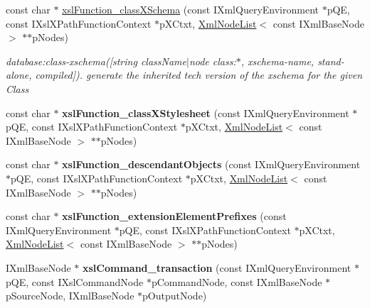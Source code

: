 \begin{DoxyCompactItemize}
\item 
const char $\ast$ \hyperlink{group__XSLModule-Functions_gaecb15d87b4313f702c17cd0e209b7104}{xsl\-Function\-\_\-class\-X\-Schema} (const \-I\-Xml\-Query\-Environment $\ast$p\-Q\-E, const \-I\-Xsl\-X\-Path\-Function\-Context $\ast$p\-X\-Ctxt, \hyperlink{classgeneral__server_1_1XmlNodeList}{\-Xml\-Node\-List}$<$ const \-I\-Xml\-Base\-Node $>$ $\ast$$\ast$p\-Nodes)
\begin{DoxyCompactList}\small\item\em database\-:class-\/xschema(\mbox{[}string class\-Name$|$node class\-:$\ast$, xschema-\/name, stand-\/alone, compiled\mbox{]}). generate the inherited tech version of the xschema for the given \-Class \end{DoxyCompactList}\item 
\hypertarget{group__XSLModule-Functions_ga083e49023fd1786191327ea21e8a41cf}{const char $\ast$ {\bfseries xsl\-Function\-\_\-class\-X\-Stylesheet} (const \-I\-Xml\-Query\-Environment $\ast$p\-Q\-E, const \-I\-Xsl\-X\-Path\-Function\-Context $\ast$p\-X\-Ctxt, \hyperlink{classgeneral__server_1_1XmlNodeList}{\-Xml\-Node\-List}$<$ const \-I\-Xml\-Base\-Node $>$ $\ast$$\ast$p\-Nodes)}\label{group__XSLModule-Functions_ga083e49023fd1786191327ea21e8a41cf}

\item 
\hypertarget{group__XSLModule-Functions_gaab1301b43a6e6453e548dafb113ec0d1}{const char $\ast$ {\bfseries xsl\-Function\-\_\-descendant\-Objects} (const \-I\-Xml\-Query\-Environment $\ast$p\-Q\-E, const \-I\-Xsl\-X\-Path\-Function\-Context $\ast$p\-X\-Ctxt, \hyperlink{classgeneral__server_1_1XmlNodeList}{\-Xml\-Node\-List}$<$ const \-I\-Xml\-Base\-Node $>$ $\ast$$\ast$p\-Nodes)}\label{group__XSLModule-Functions_gaab1301b43a6e6453e548dafb113ec0d1}

\item 
\hypertarget{group__XSLModule-Functions_gafd74ad032477d92033656e0e08b160f5}{const char $\ast$ {\bfseries xsl\-Function\-\_\-extension\-Element\-Prefixes} (const \-I\-Xml\-Query\-Environment $\ast$p\-Q\-E, const \-I\-Xsl\-X\-Path\-Function\-Context $\ast$p\-X\-Ctxt, \hyperlink{classgeneral__server_1_1XmlNodeList}{\-Xml\-Node\-List}$<$ const \-I\-Xml\-Base\-Node $>$ $\ast$$\ast$p\-Nodes)}\label{group__XSLModule-Functions_gafd74ad032477d92033656e0e08b160f5}

\item 
\hypertarget{group__XSLModule-Commands_gab2dddea30cfe8cb8c47ac25ac9c7f841}{\-I\-Xml\-Base\-Node $\ast$ {\bfseries xsl\-Command\-\_\-transaction} (const \-I\-Xml\-Query\-Environment $\ast$p\-Q\-E, const \-I\-Xsl\-Command\-Node $\ast$p\-Command\-Node, const \-I\-Xml\-Base\-Node $\ast$p\-Source\-Node, \-I\-Xml\-Base\-Node $\ast$p\-Output\-Node)}\label{group__XSLModule-Commands_gab2dddea30cfe8cb8c47ac25ac9c7f841}


\end{DoxyCompactItemize}
